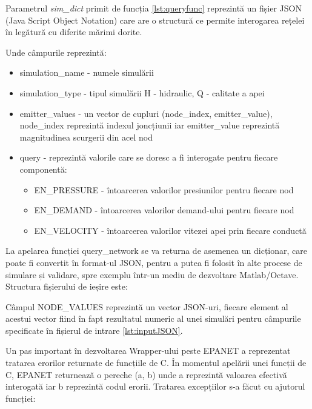
Parametrul \textit{sim\_dict} primit de funcția \ref{lst:queryfunc} reprezintă un fișier JSON (Java Script Object Notation) care are o structură ce permite interogarea rețelei în legătură cu diferite mărimi dorite.


Unde câmpurile reprezintă:
\begin{itemize}
    \item simulation\_name - numele simulării
    \item simulation\_type - tipul simulării H - hidraulic, Q - calitate a apei
    \item emitter\_values - un vector de cupluri (node\_index, emitter\_value), node\_index reprezintă indexul joncțiunii iar emitter\_value reprezintă magnitudinea scurgerii din acel nod
    \item query - reprezintă valorile care se doresc a fi interogate pentru fiecare componentă:
    \begin{itemize}
        \item EN\_PRESSURE - întoarcerea valorilor presiunilor pentru fiecare nod
        \item EN\_DEMAND - întoarcerea valorilor demand-ului pentru fiecare nod
        \item EN\_VELOCITY - întoarcerea valorilor vitezei apei prin fiecare conductă
    \end{itemize}
\end{itemize}
La apelarea funcției query\_network se va returna de asemenea un dicționar, care poate fi convertit în format-ul JSON, pentru a putea fi folosit în alte procese de simulare și validare, spre exemplu într-un mediu de dezvoltare Matlab/Octave. Structura fișierului de ieșire este:




Câmpul NODE\_VALUES reprezintă un vector JSON-uri, fiecare element al acestui vector fiind în fapt rezultatul numeric al unei simulări pentru câmpurile specificate în fișierul de intrare \ref{lst:inputJSON}.

Un pas important în dezvoltarea Wrapper-ului peste EPANET a reprezentat tratarea erorilor returnate de funcțiile de C. În momentul apelării unei funcții de C, EPANET returnează o pereche (a, b) unde a reprezintă valoarea efectivă interogată iar b reprezintă codul erorii. Tratarea excepțiilor s-a făcut cu ajutorul funcției:


